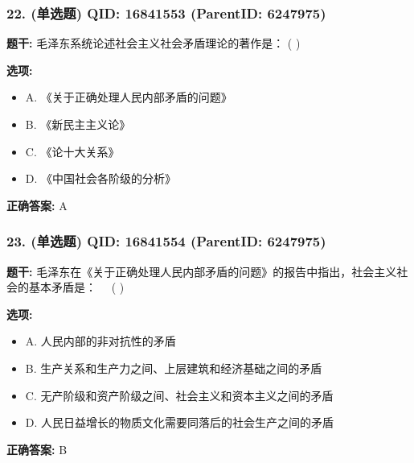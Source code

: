 \documentclass[12pt,UTF8]{ctexart}
\begin{document}
\subsubsection*{22. (单选题) \small QID: 16841553 (ParentID: 6247975)}

\textbf{题干:}
毛泽东系统论述社会主义社会矛盾理论的著作是： ( )



\textbf{选项:}
\begin{itemize}[leftmargin=*]

  \item A. 《关于正确处理人民内部矛盾的问题》

  \item B. 《新民主主义论》

  \item C. 《论十大关系》

  \item D. 《中国社会各阶级的分析》

\end{itemize}

\textbf{正确答案:}
A

\vspace{0.3em}\hrulefill\vspace{0.7em}

\subsubsection*{23. (单选题) \small QID: 16841554 (ParentID: 6247975)}

\textbf{题干:}
毛泽东在《关于正确处理人民内部矛盾的问题》的报告中指出，社会主义社会的基本矛盾是：   ( )



\textbf{选项:}
\begin{itemize}[leftmargin=*]

  \item A. 人民内部的非对抗性的矛盾

  \item B. 生产关系和生产力之间、上层建筑和经济基础之间的矛盾

  \item C. 无产阶级和资产阶级之间、社会主义和资本主义之间的矛盾

  \item D. 人民日益增长的物质文化需要同落后的社会生产之间的矛盾

\end{itemize}

\textbf{正确答案:}
B
\end{document}
